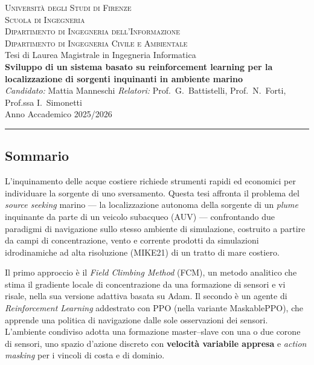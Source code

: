 \documentclass[12pt,a4paper]{article}
\begin{document}
\begin{center}
    {\normalsize\scshape Universit\`a degli Studi di Firenze}\\[1pt]
    {\small\scshape Scuola di Ingegneria}\\[2pt]
    {\small\scshape Dipartimento di Ingegneria dell'Informazione}\\[1pt]
    {\small\scshape Dipartimento di Ingegneria Civile e Ambientale}\\[6pt]
    {\small Tesi di Laurea Magistrale in Ingegneria Informatica}\\[10pt]
    {\large\bfseries Sviluppo di un sistema basato su reinforcement learning per la
    localizzazione di sorgenti inquinanti in ambiente marino}\\[8pt]
    {\small\itshape Candidato:} Mattia Manneschi \qquad
    {\small\itshape Relatori:} Prof.\ G.\ Battistelli, Prof.\ N.\ Forti, Prof.ssa I.\ Simonetti\\[2pt]
    {\small Anno Accademico 2025/2026}
\end{center}

\vspace{4mm}
\hrule
\vspace{6mm}

\subsection*{Sommario}

L'inquinamento delle acque costiere richiede strumenti rapidi ed economici per individuare
la sorgente di uno sversamento. Questa tesi affronta il problema del \emph{source seeking}
marino --- la localizzazione autonoma della sorgente di un \emph{plume} inquinante da parte
di un veicolo subacqueo (AUV) --- confrontando due paradigmi di navigazione sullo stesso
ambiente di simulazione, costruito a partire da campi di concentrazione, vento e corrente
prodotti da simulazioni idrodinamiche ad alta risoluzione (MIKE21) di un tratto di mare
costiero.

Il primo approccio \`e il \emph{Field Climbing Method} (FCM), un metodo analitico che stima
il gradiente locale di concentrazione da una formazione di sensori e vi risale, nella sua
versione adattiva basata su Adam. Il secondo \`e un agente di \emph{Reinforcement Learning}
addestrato con PPO (nella variante MaskablePPO), che apprende una politica di navigazione
dalle sole osservazioni dei sensori. L'ambiente condiviso adotta una formazione
master--slave con una o due corone di sensori, uno spazio d'azione discreto con
\textbf{velocit\`a variabile appresa} e \emph{action masking} per i vincoli di costa e di
dominio.
\end{document}
